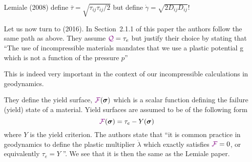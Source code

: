 \begin{remark}
Lemiale \etal (2008) define $\overline{\tau}=\sqrt{\tau_{ij}\tau_{ij}/2}$
but define $\dot{\gamma}=\sqrt{2 D_{ij}D_{ij}}$!
\end{remark}

Let us now turn to \textcite{spmw16} (2016).
In Section~2.1.1 of this paper the authors follow the same path as above. 
They assume ${\color{violet}\cal Q}=\tau_e$ but justify their choice by stating that 
``The use of incompressible materials mandates that we use a plastic potential g which is not a function of the pressure $p$''

This is indeed very important in the context of our incompressible calculations in geodynamics. 

They define the yield surface, ${\color{violet}\cal F}(\bm\sigma)$ which is a scalar function defining the failure (yield) state of a material. Yield surfaces are
assumed to be of the following form 
\[
{\color{violet}\cal F}(\bm\sigma) =\tau_e - Y(\bm\sigma)
\]
where $Y$ is the yield criterion.
The authors state that ``it is common practice in geodynamics to define the
plastic multiplier $\dot\lambda$ which exactly satisfies ${\color{violet}\cal F}=0$, 
or equivalently $\tau_e=Y$ \cite{lemm08}''.
We see that it is then the same as the Lemiale \etal paper.





